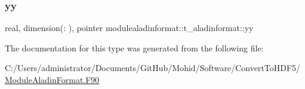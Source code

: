 \subsubsection{\texorpdfstring{yy}{yy}}
{\footnotesize\ttfamily real, dimension(\+:  ), pointer modulealadinformat\+::t\+\_\+aladinformat\+::yy\hspace{0.3cm}{\ttfamily [private]}}



The documentation for this type was generated from the following file\+:\begin{DoxyCompactItemize}
\item 
C\+:/\+Users/administrator/\+Documents/\+Git\+Hub/\+Mohid/\+Software/\+Convert\+To\+H\+D\+F5/\mbox{\hyperlink{_module_aladin_format_8_f90}{Module\+Aladin\+Format.\+F90}}\end{DoxyCompactItemize}
